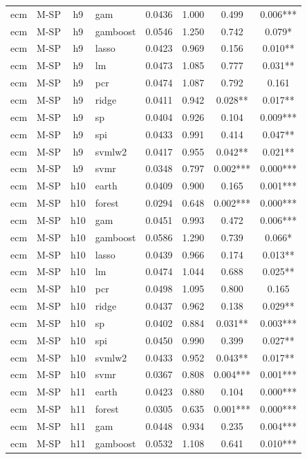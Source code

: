 \begin{ThreePartTable}
\begin{longtable}[t]{llclcccc}
ecm & M-SP & h9 & gam & 0.0436 & 1.000 & 0.499 & 0.006***\\
ecm & M-SP & h9 & gamboost & 0.0546 & 1.250 & 0.742 & 0.079*\\
ecm & M-SP & h9 & lasso & 0.0423 & 0.969 & 0.156 & 0.010**\\
ecm & M-SP & h9 & lm & 0.0473 & 1.085 & 0.777 & 0.031**\\
ecm & M-SP & h9 & pcr & 0.0474 & 1.087 & 0.792 & 0.161\\
ecm & M-SP & h9 & ridge & 0.0411 & 0.942 & 0.028** & 0.017**\\
ecm & M-SP & h9 & sp & 0.0404 & 0.926 & 0.104 & 0.009***\\
ecm & M-SP & h9 & spi & 0.0433 & 0.991 & 0.414 & 0.047**\\
ecm & M-SP & h9 & svmlw2 & 0.0417 & 0.955 & 0.042** & 0.021**\\
ecm & M-SP & h9 & svmr & 0.0348 & 0.797 & 0.002*** & 0.000***\\
\addlinespace
ecm & M-SP & h10 & earth & 0.0409 & 0.900 & 0.165 & 0.001***\\
ecm & M-SP & h10 & forest & 0.0294 & 0.648 & 0.002*** & 0.000***\\
ecm & M-SP & h10 & gam & 0.0451 & 0.993 & 0.472 & 0.006***\\
ecm & M-SP & h10 & gamboost & 0.0586 & 1.290 & 0.739 & 0.066*\\
ecm & M-SP & h10 & lasso & 0.0439 & 0.966 & 0.174 & 0.013**\\
ecm & M-SP & h10 & lm & 0.0474 & 1.044 & 0.688 & 0.025**\\
ecm & M-SP & h10 & pcr & 0.0498 & 1.095 & 0.800 & 0.165\\
ecm & M-SP & h10 & ridge & 0.0437 & 0.962 & 0.138 & 0.029**\\
ecm & M-SP & h10 & sp & 0.0402 & 0.884 & 0.031** & 0.003***\\
ecm & M-SP & h10 & spi & 0.0450 & 0.990 & 0.399 & 0.027**\\
ecm & M-SP & h10 & svmlw2 & 0.0433 & 0.952 & 0.043** & 0.017**\\
ecm & M-SP & h10 & svmr & 0.0367 & 0.808 & 0.004*** & 0.001***\\
\addlinespace
ecm & M-SP & h11 & earth & 0.0423 & 0.880 & 0.104 & 0.000***\\
ecm & M-SP & h11 & forest & 0.0305 & 0.635 & 0.001*** & 0.000***\\
ecm & M-SP & h11 & gam & 0.0448 & 0.934 & 0.235 & 0.004***\\
ecm & M-SP & h11 & gamboost & 0.0532 & 1.108 & 0.641 & 0.010***\\

\end{longtable}
\end{ThreePartTable}
